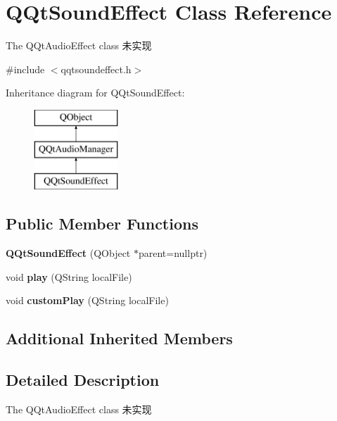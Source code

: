 \hypertarget{class_q_qt_sound_effect}{}\section{Q\+Qt\+Sound\+Effect Class Reference}
\label{class_q_qt_sound_effect}


The Q\+Qt\+Audio\+Effect class 未实现  




{\ttfamily \#include $<$qqtsoundeffect.\+h$>$}

Inheritance diagram for Q\+Qt\+Sound\+Effect\+:\begin{figure}[H]
\begin{center}
\leavevmode
\includegraphics[height=3.000000cm]{class_q_qt_sound_effect}
\end{center}
\end{figure}
\subsection*{Public Member Functions}
\begin{DoxyCompactItemize}
\item 
\mbox{\label{class_q_qt_sound_effect_af4dcef0432602342a7febbbc9587cfbb}} 
{\bfseries Q\+Qt\+Sound\+Effect} (Q\+Object $\ast$parent=nullptr)
\item 
\mbox{\label{class_q_qt_sound_effect_a8d3cc425711872e18cfd97a807782809}} 
void {\bfseries play} (Q\+String local\+File)
\item 
\mbox{\label{class_q_qt_sound_effect_a316a433f00126560d7f2fbf94912732e}} 
void {\bfseries custom\+Play} (Q\+String local\+File)
\end{DoxyCompactItemize}
\subsection*{Additional Inherited Members}


\subsection{Detailed Description}
The Q\+Qt\+Audio\+Effect class 未实现 

